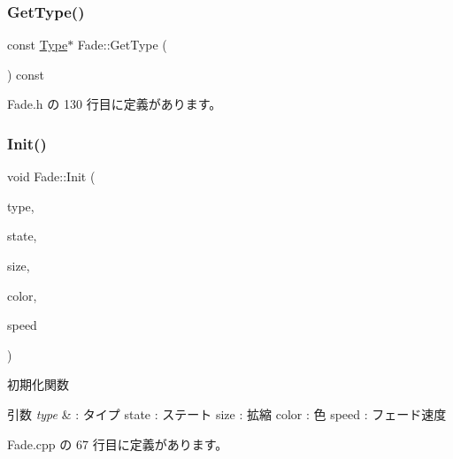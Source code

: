 \mbox{\label{class_fade_aed5a29d39a5fd6161a9aed73d5f30870}} 
\subsubsection{\texorpdfstring{Get\+Type()}{GetType()}}
{\footnotesize\ttfamily const \mbox{\hyperlink{class_fade_ac06f27215b454aa05b93c236476d6e80}{Type}}$\ast$ Fade\+::\+Get\+Type (\begin{DoxyParamCaption}{ }\end{DoxyParamCaption}) const\hspace{0.3cm}{\ttfamily [inline]}}



 Fade.\+h の 130 行目に定義があります。

\mbox{\label{class_fade_aab12848f7102a219968c86ed699a6e5d}} 
\subsubsection{\texorpdfstring{Init()}{Init()}}
{\footnotesize\ttfamily void Fade\+::\+Init (\begin{DoxyParamCaption}\item[{\mbox{\hyperlink{class_fade_ac06f27215b454aa05b93c236476d6e80}{Type}}}]{type,  }\item[{\mbox{\hyperlink{class_fade_ae77826bf3ff2ab95fb7b3b6f95cba80a}{State}}}]{state,  }\item[{\mbox{\hyperlink{_vector3_d_8h_a5ef6e95dfc5f9d3820b71772d99bbc25}{Vec2}}}]{size,  }\item[{\mbox{\hyperlink{_vector3_d_8h_a680c30c4a07d86fe763c7e01169cd6cc}{X\+Color4}}}]{color,  }\item[{float}]{speed }\end{DoxyParamCaption})}



初期化関数 


\begin{DoxyParams}{引数}
{\em type} & \+: タイプ state \+: ステート size \+: 拡縮 color \+: 色 speed \+: フェード速度 \\
\hline
\end{DoxyParams}


 Fade.\+cpp の 67 行目に定義があります。

\mbox{\label{class_fade_ae77d06811869d3c8162a42c3e0e14f7f}} 
